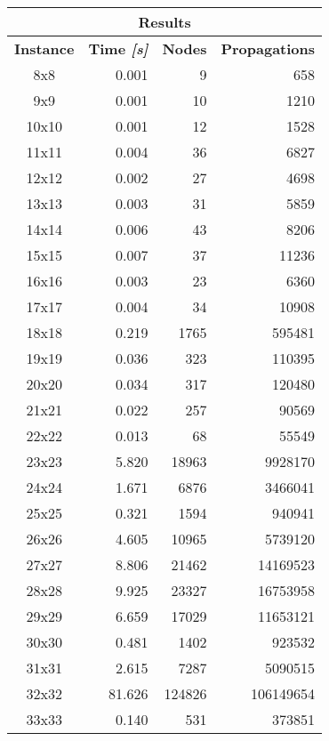 \begin{center}
    \begin{tabular}{|c|r|r|r|}
        \hline
        \multicolumn{4}{|c|}{\textbf{Results}} \\
        \hline
        \textbf{Instance} & \textbf{Time \textit{[s]}} & \textbf{Nodes} & \textbf{Propagations} \\
        \hline
        8x8 & 0.001 & 9 & 658 \\ \hline
        9x9 & 0.001 & 10 & 1210 \\ \hline
        10x10 & 0.001 & 12 & 1528 \\ \hline
        11x11 & 0.004 & 36 & 6827 \\ \hline
        12x12 & 0.002 & 27 & 4698 \\ \hline
        13x13 & 0.003 & 31 & 5859 \\ \hline
        14x14 & 0.006 & 43 & 8206 \\ \hline
        15x15 & 0.007 & 37 & 11236 \\ \hline
        16x16 & 0.003 & 23 & 6360 \\ \hline
        17x17 & 0.004 & 34 & 10908 \\ \hline
        18x18 & 0.219 & 1765 & 595481 \\ \hline
        19x19 & 0.036 & 323 & 110395 \\ \hline
        20x20 & 0.034 & 317 & 120480 \\ \hline
        21x21 & 0.022 & 257 & 90569 \\ \hline
        22x22 & 0.013 & 68 & 55549 \\ \hline
        23x23 & 5.820 & 18963 & 9928170 \\ \hline
        24x24 & 1.671 & 6876 & 3466041 \\ \hline
        25x25 & 0.321 & 1594 & 940941 \\ \hline
        26x26 & 4.605 & 10965 & 5739120 \\ \hline
        27x27 & 8.806 & 21462 & 14169523 \\ \hline
        28x28 & 9.925 & 23327 & 16753958 \\ \hline
        29x29 & 6.659 & 17029 & 11653121 \\ \hline
        30x30 & 0.481 & 1402 & 923532 \\ \hline
        31x31 & 2.615 & 7287 & 5090515 \\ \hline
        32x32 & 81.626 & 124826 & 106149654 \\ \hline
        33x33 & 0.140 & 531 & 373851 \\ \hline

\end{tabular}
\end{center}
